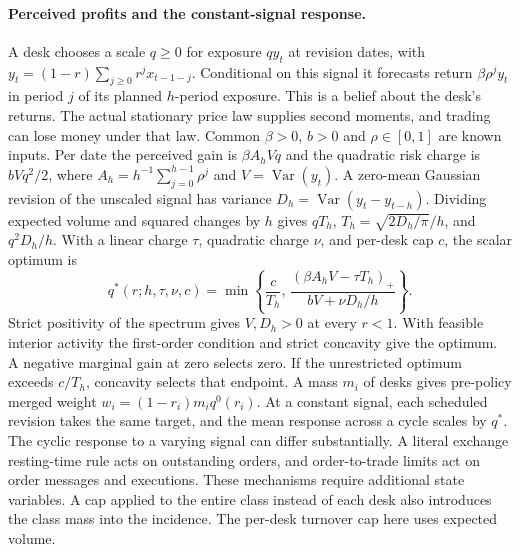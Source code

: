 \documentclass[12pt]{article}
\theoremstyle{definition}
\theoremstyle{remark}
\begin{document}
\paragraph{Perceived profits and the constant-signal response.}
A desk chooses a scale $q\ge0$ for exposure $q y_t$ at revision dates, with
$y_t=(1-r)\sum_{j\ge0}r^j x_{t-1-j}$. Conditional on this signal it forecasts return
$\beta\rho^j y_t$ in period $j$ of its planned $h$-period exposure. This is a
belief about the desk's returns. The actual stationary price law supplies second
moments, and trading can lose money under that law. Common $\beta>0$, $b>0$ and
$\rho\in[0,1]$ are known inputs. Per date the perceived gain is $\beta A_h V q$ and
the quadratic risk charge is $bVq^2/2$, where $A_h=h^{-1}\sum_{j=0}^{h-1}\rho^j$ and
$V=\operatorname{Var}(y_t)$. A zero-mean Gaussian revision of the unscaled signal has
variance $D_h=\operatorname{Var}(y_t-y_{t-h})$. Dividing expected volume and squared
changes by $h$ gives $qT_h$, $T_h=\sqrt{2D_h/\pi}/h$, and $q^2D_h/h$. With a linear
charge $\tau$, quadratic charge $\nu$, and per-desk cap $c$, the scalar optimum is
\[
 q^*(r;h,\tau,\nu,c)=\min\left\{\frac{c}{T_h},\,
          \frac{(\beta A_h V-\tau T_h)_+}{bV+\nu D_h/h}\right\}.
\]
Strict positivity of the spectrum gives $V,D_h>0$ at every $r<1$. With feasible
interior activity the first-order condition and strict concavity give the optimum.
A negative marginal gain at zero selects zero. If the unrestricted optimum exceeds
$c/T_h$, concavity selects that endpoint. A mass $m_i$ of desks gives pre-policy
merged weight $w_i=(1-r_i)m_iq^0(r_i)$. At a constant signal, each scheduled revision
takes the same target, and the mean response across a cycle scales by $q^*$. The
cyclic response to a varying signal can differ substantially. A literal exchange
resting-time rule acts on outstanding orders, and order-to-trade limits act on order
messages and executions. These mechanisms require additional state variables. A cap
applied to the entire class instead of each desk also introduces the class mass into
the incidence. The per-desk turnover cap here uses expected volume.
\end{document}
